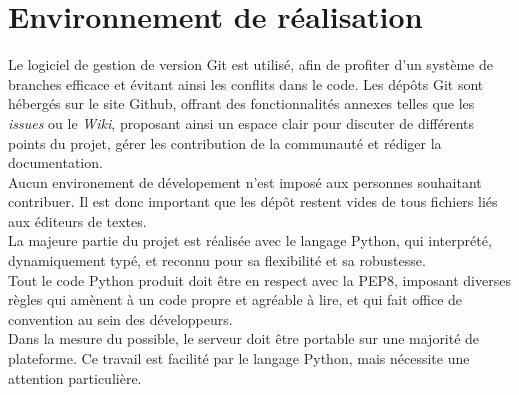 \section{Environnement de réalisation}
Le logiciel de gestion de version Git est utilisé, afin de profiter d'un système de branches efficace et évitant ainsi les conflits dans le code.
Les dépôts Git sont hébergés sur le site Github, offrant des fonctionnalités annexes telles que les \textit{issues} ou le \textit{Wiki}, proposant ainsi un espace clair pour discuter de différents points du projet, gérer les contribution de la communauté et rédiger la documentation.\\

Aucun environement de dévelopement n'est imposé aux personnes souhaitant contribuer. Il est donc important que les dépôt restent vides de tous fichiers liés aux éditeurs de textes.\\

La majeure partie du projet est réalisée avec le langage Python, qui interprété, dynamiquement typé, et reconnu pour sa flexibilité et sa robustesse.\\
Tout le code Python produit doit être en respect avec la PEP8, imposant diverses règles qui amènent à un code propre et agréable à lire, et qui fait office de convention au sein des développeurs.\\

Dans la mesure du possible, le serveur doit être portable sur une majorité de plateforme. Ce travail est facilité par le langage Python, mais nécessite une attention particulière.
